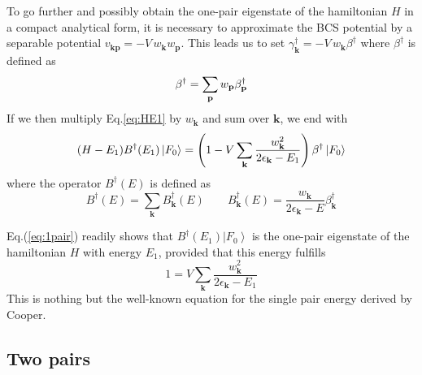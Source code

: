 \documentclass[aps,prb,superscriptaddress,showpacs,reprint,lengthcheck]{revtex4-1}
\newcommand{\vk}{\ensuremath{\mathbf{k}}}
\newcommand{\vp}{\ensuremath{\mathbf{p}}}
\begin{document}
To go further and possibly obtain the one-pair eigenstate of the hamiltonian $H$
in a compact analytical form, it is necessary to approximate the BCS potential by a separable potential $v_{\mathbf{k} \mathbf{p} }=-V\,w_\vk{}w_\vp$.
This leads us to set $\gamma^{\dagger}_\vk=-V\,w_\vk\beta^{\dagger}$ where $\beta^{\dagger}$ is defined as 
\begin{equation}  \label{eq:gammaBeta}
\beta^{\dagger}=\sum_%
\vp{}w_\vp\beta^{\dagger}_\vp
\end{equation}
If we then multiply Eq.\eqref{eq:HE1} by $w_\vk$ and sum over $\mathbf{k} $,
we end with 
\begin{equation}\label{eq:1pair}
(H-E _1)B^{\dagger}(E _1)\left|F_0\right>  =\left(1-V\sum_\vk{%
\frac{w_\vk^2}{2\epsilon_\vk-E _1}}\right)
\beta^{\dagger}\left|F_0\right>  
\end{equation}
where the operator $B^{\dagger}(E)$ is defined as  
\begin{equation}  \label{eq:B}
B^{\dagger}(E)=\sum_\vk{B_\vk^{\dagger}(E)}\quad\quad B_\vk^{\dagger}(E)=\frac{w_\vk}{2\epsilon_\vk-E}\beta^{\dagger}_\vk
\end{equation}

Eq.(\ref{eq:1pair}) readily shows that  $B^{\dagger}(%
E _1)\left|F_0\right> $ is  the one-pair eigenstate of the hamiltonian $H$ with energy  $%
E _1$, provided that this energy fulfills
\begin{equation}  \label{eq:SchOne}
1=V\sum_\vk{\frac{w_\vk^2}{2\epsilon_\vk-E _1}}
\end{equation}
This is nothing but the well-known equation for the single pair energy
derived by Cooper.

\subsection{Two pairs}
\end{document}
